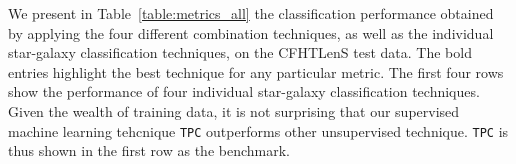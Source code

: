 \documentclass[useAMS,usenatbib]{mn2e}
\begin{document}
\begin{table}
  \caption{A summary of the classification performance metrics
           for the four individual methods
           and the four different classification combination methods
           as applied to the CFHTLenS data,
           with no cut applied to the training data set.
           The definition of the metrics is summarized in
           Table~\ref{table:metrics}.
           The bold entries highlight the best performance values
           within each column.}
  \centering
  
  \label{table:metrics_all}
\end{table}

We present in Table~\ref{table:metrics_all}
the classification performance obtained by
applying the four different combination techniques,
as well as the individual star-galaxy classification techniques,
on the CFHTLenS test data.
The bold entries highlight the best technique for any particular metric.
The first four rows show the performance of four individual star-galaxy
classification techniques.
Given the wealth of training data, it is not surprising that 
our supervised machine learning tehcnique \texttt{TPC}
outperforms other unsupervised technique.
\texttt{TPC} is thus shown in the first row as the benchmark.
\end{document}
